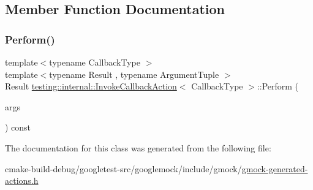 \subsection{Member Function Documentation}
\mbox{\label{classtesting_1_1internal_1_1InvokeCallbackAction_a74278acbfc51fe7407fdabc9d6a42c70}} 
\subsubsection{\texorpdfstring{Perform()}{Perform()}}
{\footnotesize\ttfamily template$<$typename Callback\+Type $>$ \\
template$<$typename Result , typename Argument\+Tuple $>$ \\
Result \mbox{\hyperlink{classtesting_1_1internal_1_1InvokeCallbackAction}{testing\+::internal\+::\+Invoke\+Callback\+Action}}$<$ Callback\+Type $>$\+::Perform (\begin{DoxyParamCaption}\item[{const Argument\+Tuple \&}]{args }\end{DoxyParamCaption}) const\hspace{0.3cm}{\ttfamily [inline]}}



The documentation for this class was generated from the following file\+:\begin{DoxyCompactItemize}
\item 
cmake-\/build-\/debug/googletest-\/src/googlemock/include/gmock/\mbox{\hyperlink{gmock-generated-actions_8h}{gmock-\/generated-\/actions.\+h}}\end{DoxyCompactItemize}
